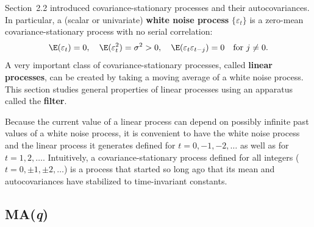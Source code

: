 
Section~2.2 introduced covariance-stationary processes and their autocovariances.
In particular, a (scalar or univariate) \textbf{white noise process} $\{\varepsilon_t\}$ is a zero-mean
covariance-stationary process with no serial correlation:
\[
  \E(\varepsilon_t) = 0, \quad \E(\varepsilon_t^2) = \sigma^2 > 0, \quad
  \E(\varepsilon_t \varepsilon_{t-j}) = 0 \quad \text{for } j \neq 0.
\]
A very important class of covariance-stationary processes, called \textbf{linear processes},
can be created by taking a moving average of a white noise process. This section
studies general properties of linear processes using an apparatus called the \textbf{filter}.

Because the current value of a linear process can depend on possibly infinite
past values of a white noise process, it is convenient to have the white noise process
and the linear process it generates defined for $t = 0, -1, -2, \ldots$ as well
as for $t = 1, 2, \ldots$. Intuitively, a covariance-stationary process defined for all
integers ($t = 0, \pm 1, \pm 2, \ldots$) is a process that started so long ago that its mean and
autocovariances have stabilized to time-invariant constants.

\subsection*{MA(\textit{q})}

